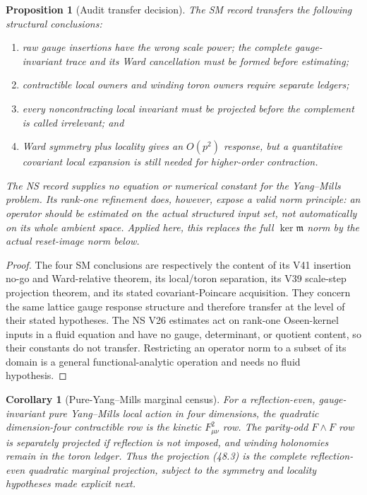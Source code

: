 \documentclass[11pt,oneside]{book}
\newtheorem{proposition}[theorem]{Proposition}
\newtheorem{corollary}[theorem]{Corollary}
\theoremstyle{definition}
\theoremstyle{remark}
\begin{document}
\begin{proposition}[Audit transfer decision]
\label{prop:e8v50-audit-transfer}
The SM record transfers the following structural conclusions:
\begin{enumerate}
\item raw gauge insertions have the wrong scale power; the complete
      gauge-invariant trace and its Ward cancellation must be formed
      before estimating;
\item contractible local owners and winding toron owners require
      separate ledgers;
\item every noncontracting local invariant must be projected before
      the complement is called irrelevant; and
\item Ward symmetry plus locality gives an \(O(p^2)\) response, but
      a quantitative covariant local expansion is still needed for
      higher-order contraction.
\end{enumerate}
The NS record supplies no equation or numerical constant for the
Yang--Mills problem.  Its rank-one refinement does, however, expose
a valid norm principle: an operator should be estimated on the
actual structured input set, not automatically on its whole ambient
space.  Applied here, this replaces the full
\(\ker{\mathfrak m}\) norm by the actual reset-image norm below.
\end{proposition}

\begin{proof}
The four SM conclusions are respectively the content of its
V41 insertion no-go and Ward-relative theorem, its local/toron
separation, its V39 scale-step projection theorem, and its stated
covariant-Poincare acquisition.  They concern the same lattice
gauge response structure and therefore transfer at the level of
their stated hypotheses.  The NS V26 estimates act on rank-one
Oseen-kernel inputs in a fluid equation and have no gauge,
determinant, or quotient content, so their constants do not
transfer.  Restricting an operator norm to a subset of its domain is
a general functional-analytic operation and needs no fluid
hypothesis.
\end{proof}

\begin{corollary}[Pure-Yang--Mills marginal census]
\label{cor:e8v50-YM-census}
For a reflection-even, gauge-invariant pure Yang--Mills local
action in four dimensions, the quadratic dimension-four
contractible row is the kinetic \(F_{\mu\nu}^2\) row.  The
parity-odd \(F\wedge F\) row is separately projected if reflection
is not imposed, and winding holonomies remain in the toron ledger.
Thus the projection (48.3) is the complete reflection-even
quadratic marginal projection, subject to the symmetry and locality
hypotheses made explicit next.
\end{corollary}
\end{document}
